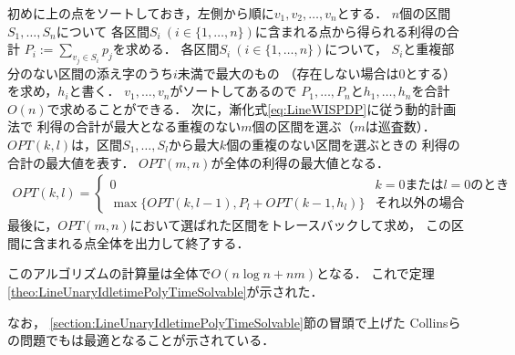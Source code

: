 初めに{\graphLine}上の点をソートしておき，左側から順に$v_1, v_2, \ldots, v_n$とする．
$n$個の区間$S_1, \ldots, S_n$について
各区間$S_i\ (i \in \{ 1, \ldots, n \})$に含まれる点から得られる利得の合計
$P_i := \sum_{v_j \in S_i} p_j$を求める．
%
各区間$S_i\ (i \in \{ 1, \ldots, n \})$について，
$S_i$と重複部分のない区間の添え字のうち$i$未満で最大のもの
（存在しない場合は$0$とする）を求め，$h_i$と書く．
$v_1, \ldots, v_n$がソートしてあるので
$P_1, \ldots, P_n$と$h_1, \ldots, h_n$を合計$O(n)$で求めることができる．
%
次に，漸化式\eqref{eq:LineWISPDP}に従う動的計画法で
利得の合計が最大となる重複のない$m$個の区間を選ぶ（$m$は巡査数）．
$OPT(k, l)$は，区間$S_1, \ldots, S_l$から最大$k$個の重複のない区間を選ぶときの
利得の合計の最大値を表す．
$OPT(m, n)$が全体の利得の最大値となる．
\begin{align}
  \label{eq:LineWISPDP}
  OPT(k, l) = 
  \begin{cases}
    0 & \text{$k = 0$または$l = 0$のとき} \\
    \max \{
      OPT(k, l - 1), 
      P_l + OPT(k - 1, h_l)
    \}
    & \text{それ以外の場合}
  \end{cases}
\end{align}
最後に，$OPT(m, n)$において選ばれた区間をトレースバックして求め，
この区間に含まれる点全体を出力して終了する．

このアルゴリズムの計算量は全体で$O(n \log n + nm)$となる．
これで定理\ref{theo:LineUnaryIdletimePolyTimeSolvable}が示された．

なお，
\ref{section:LineUnaryIdletimePolyTimeSolvable}節の冒頭で上げた
Collinsらの問題でも{\indSectOperation}は最適となることが示されている\cite[Theorem 2.1]{collins2013optimal}．

